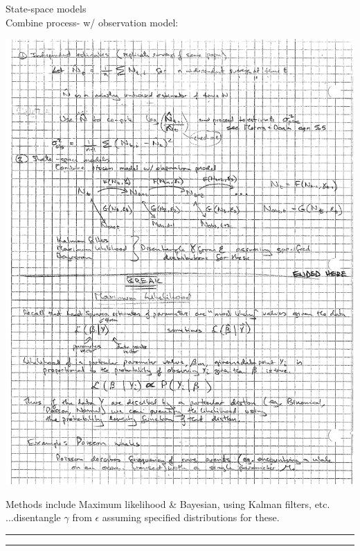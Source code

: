 \documentclass{article}
\newcommand{\ind}{\-\hspace{1cm}}
\newcommand*\circled[1]{\tikz[baseline=(char.base)]{
            \node[shape=circle,draw,inner sep=2pt] (char) {#1};}}
\begin{document}
\circled{2} State-space models\\
Combine process- w/ observation model:
\begin{center}
	\includegraphics[width=16cm]{figs/image4.pdf}
\end{center}

Methods include Maximum likelihood \& Bayesian, using Kalman filters, etc.\\
\ind ...disentangle $\gamma$ from $\epsilon$ assuming specified distributions for these.

\rule[0.5ex]{\linewidth}{1pt}
\rule[0.5ex]{\linewidth}{1pt}
\end{document}
